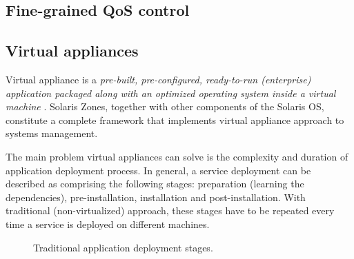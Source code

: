 \documentclass[11pt]{book}
\begin{document}



      \subsection{Fine-grained QoS control}



      \subsection{Virtual appliances}
      \label{sub:}



        Virtual appliance is a \textit{pre-built, pre-configured, ready-to-run (enterprise) application packaged along
        with an optimized operating system inside a virtual machine} \cite{changhua}. Solaris Zones, together with other
        components of the Solaris OS, constitute a complete framework that implements virtual appliance approach to
        systems management.

        The main problem virtual appliances can solve is the complexity and duration of application deployment process.
        In general, a service deployment can be described as comprising the following stages: preparation (learning the
        dependencies), pre-installation, installation and post-installation. With traditional (non-virtualized)
        approach, these stages have to be repeated every time a service is deployed on different machines.

        \begin{figure}[H]
          \begin{center}
          \end{center}

          \caption{Traditional application deployment stages.}
        \end{figure}
\end{document}
